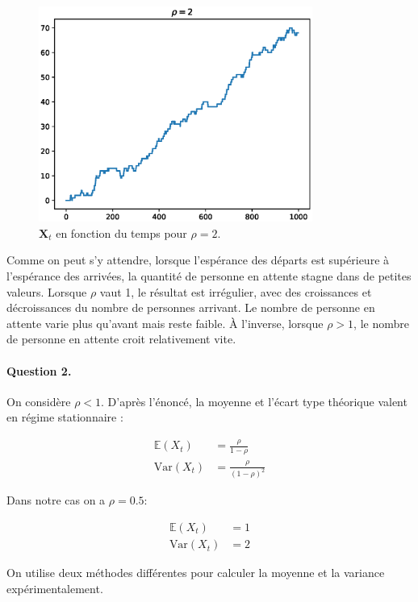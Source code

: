 \documentclass[12pt,a4paper]{article}
\begin{document}
\begin{figure}[H]
	\centering
	\includegraphics[width=0.8\textwidth]{20.eps}
	\caption{$\mathbf{X}_t$ en fonction du temps pour $\rho = 2$.}
\end{figure}

Comme on peut s'y attendre, lorsque l’espérance des départs est supérieure à l'espérance des arrivées, la quantité de personne en attente stagne dans de petites valeurs. Lorsque $\rho$ vaut 1, le résultat est irrégulier, avec des croissances et décroissances du nombre de personnes arrivant. Le nombre de personne en attente varie plus qu'avant mais reste faible. À l'inverse, lorsque $\rho > 1$, le nombre de personne en attente croit relativement vite.

\paragraph*{Question 2.}

On considère $\rho < 1$. D'après l'énoncé, la moyenne et l'écart type théorique valent en régime stationnaire :

\begin{align*}
\mathbb{E}(X_t) &= \frac{\rho}{1 - \rho} \\
\text{Var}(X_t) &= \frac{\rho}{(1 - \rho)^2}
\end{align*}

Dans notre cas on a $\rho = 0.5$:

\begin{align*}
\mathbb{E}(X_t) &= 1 \\
\text{Var}(X_t) &= 2
\end{align*}

On utilise deux méthodes différentes pour calculer la moyenne et la variance expérimentalement.
\end{document}
